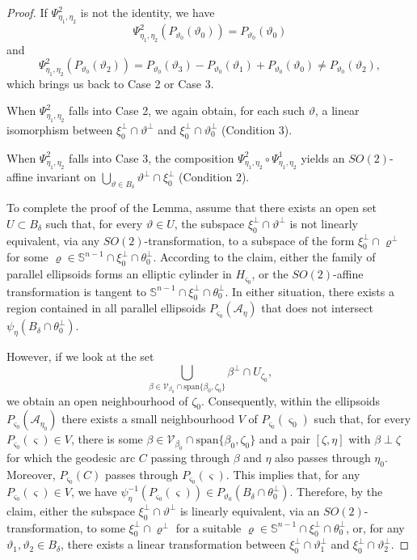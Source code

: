 \documentclass[amsfonts,reqno,11pt]{amsart}
\newcommand{\sphere}{\mathbb{S}^{n-1}}
\begin{document}
\begin{proof}
If $\Psi^2_{\eta_1,\eta_2}$ is not the identity, we have
$$
\Psi^2_{\eta_1,\eta_2}(P_{\vartheta_0}(\vartheta_0)) = P_{\vartheta_0}(\vartheta_0)
$$
and
$$
\Psi^2_{\eta_1,\eta_2}(P_{\vartheta_0}(\vartheta_2)) 
= P_{\vartheta_0}(\vartheta_3) - P_{\vartheta_0}(\vartheta_1) + P_{\vartheta_0}(\vartheta_0) 
\neq P_{\vartheta_0}(\vartheta_2),
$$
which brings us back to Case 2 or Case 3.

When $\Psi^2_{\eta_1,\eta_2}$ falls into Case 2, we again obtain, for each such $\vartheta$, a linear isomorphism between $\xi_0^\perp\cap\vartheta^\perp$ and $\xi_0^\perp\cap\vartheta_0^\perp$ (Condition 3).

When $\Psi^2_{\eta_1,\eta_2}$ falls into Case 3, the composition $\Psi^2_{\eta_1,\eta_2}\circ \Psi^1_{\eta_1,\eta_2}$ yields an $SO(2)$-affine invariant on $\bigcup_{\vartheta\in B_\delta}\vartheta^\perp\cap\xi_0^\perp$ (Condition 2).

To complete the proof of the Lemma, assume that there exists an open set $U \subset B_\delta$ such that, for every $\vartheta\in U$, the subspace $\xi_0^\perp\cap\vartheta^\perp$ is not linearly equivalent, via any $SO(2)$-transformation, to a subspace of the form $\xi_0^\perp\cap\varrho^\perp$ for some $\varrho\in \sphere\cap\xi_0^\perp\cap\theta_0^\perp$. According to the claim, either the family of parallel ellipsoids forms an elliptic cylinder in $H_{\varsigma_0}$, or the $SO(2)$-affine transformation is tangent to $\sphere\cap\xi_0^\perp\cap\theta_0^\perp$. In either situation, there exists a region contained in all parallel ellipsoids $P_{\varsigma_0}(\mathcal{A}_{\eta})$ that does not intersect $\psi_{\eta}(B_\delta\cap \theta_0^\perp)$.

However, if we look at the set
$$
\bigcup_{\beta\in \mathcal{V}_{\beta_0}\cap \mathrm{span}\{\beta_0,\zeta_0\}} \beta^\perp\cap U_{\zeta_0},
$$
we obtain an open neighbourhood of $\zeta_0$. Consequently, within the ellipsoids $P_{\varsigma_0}(\mathcal{A}_{\eta_0})$ there exists a small neighbourhood $V$ of $P_{\varsigma_0}(\varsigma_0)$ such that, for every $P_{\varsigma_0}(\varsigma)\in V$, there is some $\beta\in \mathcal{V}_{\beta_0}\cap \mathrm{span}\{\beta_0,\zeta_0\}$ and a pair $[\zeta,\eta]$ with $\beta\perp \zeta$ for which the geodesic arc $C$ passing through $\beta$ and $\eta$ also passes through $\eta_0$. Moreover, $P_{\varsigma_0}(C)$ passes through $P_{\varsigma_0}(\varsigma)$. This implies that, for any $P_{\varsigma_0}(\varsigma)\in V$, we have $\psi^{-1}_\eta(P_{\varsigma_0}(\varsigma))\in P_{\vartheta_0}(B_\delta\cap \theta_0^\perp)$. Therefore, by the claim, either the subspace $\xi_0^\perp\cap\vartheta^\perp$ is linearly equivalent, via an $SO(2)$-transformation, to some $\xi_0^\perp\cap\varrho^\perp$ for a suitable $\varrho\in \sphere\cap\xi_0^\perp\cap\theta_0^\perp$, or, for any $\vartheta_1,\vartheta_2\in B_\delta$, there exists a linear transformation between $\xi_0^\perp\cap\vartheta_1^\perp$ and $\xi_0^\perp\cap\vartheta_2^\perp$.  
\end{proof}
\end{document}
